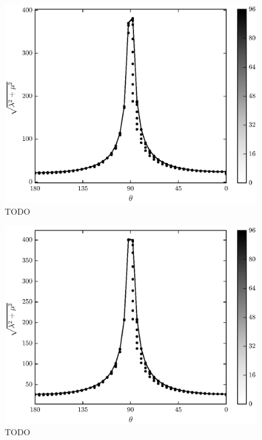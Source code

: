 	\begin{figure}
		\begin{center}
			\includegraphics{./fig/ch3/pull/p1/grid.eps}
		\end{center}		
		\caption{ TODO
		\label{fig:PullGrid:p1}}
	\end{figure}
	
	\begin{figure}
		\begin{center}
			\includegraphics{./fig/ch3/pull/p10/grid.eps}
		\end{center}		
		\caption{ TODO
		\label{fig:PullGrid:p10}}
	\end{figure}

